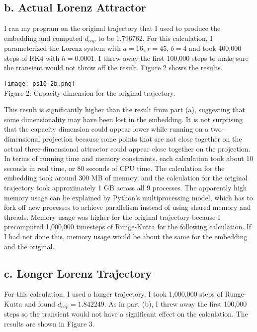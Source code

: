 \documentclass[12pt, letterpaper]{article}
\begin{document}
\subsection*{b. Actual Lorenz Attractor}

I ran my program on the original trajectory that I used to produce the embedding
and computed $d_{cap}$ to be 1.796762. For this calculation, I parameterized the 
Lorenz system with $a = 16$, $r = 45$, $b = 4$ and took 400,000 steps of RK4 with
$h = 0.0001$. I threw away the first 100,000 steps to make sure the transient 
would not throw off the result. Figure 2 shows the results.

\begin{center}
\texttt{[image: ps10\_2b.png]}
\\
Figure 2: Capacity dimension for the original trajectory.
\end{center}

This result is significantly higher than the result from part (a), suggesting 
that some dimensionality may have been lost in the embedding. It is not surprising 
that the capacity dimension could appear lower while running on a two-dimensional 
projection because some points that are not close together on the actual 
three-dimensional attractor could appear close together on the projection. In 
terms of running time and memory constraints, each calculation took about 10
seconds in real time, or 80 seconds of CPU time. The calculation for the embedding
took around 300 MB of memory, and the calculation for the original trajectory took
approximately 1 GB across all 9 processes. The apparently high memory usage can
be explained by Python's multiprocessing model, which has to fork off new 
processes to achieve parallelism instead of using shared memory and threads. 
Memory usage was higher for the original trajectory because I precomputed 
1,000,000 timesteps of Runge-Kutta for the following calculation. If I had not
done this, memory usage would be about the same for the embedding and the 
original. 

\subsection*{c. Longer Lorenz Trajectory}

For this calculation, I used a longer trajectory. I took 1,000,000 steps of 
Runge-Kutta and found $d_{cap} = 1.842249$. As in part (b), I threw away the 
first 100,000 steps so the transient would not have a significant effect on the
calculation. The results are shown in Figure 3.
\end{document}
